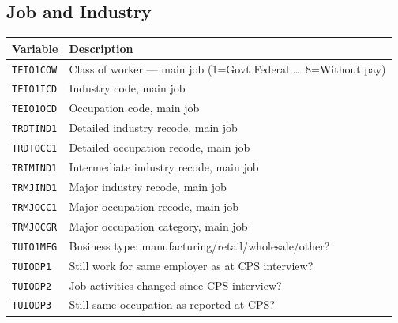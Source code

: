 \documentclass[11pt, a4paper]{article}
\begin{document}
\subsection{Job and Industry}
\begin{longtable}{L{3.5cm} L{12cm}}
\toprule \textbf{Variable} & \textbf{Description} \\ \midrule \endhead
\bottomrule \endfoot
\texttt{TEIO1COW} & Class of worker --- main job (1=Govt Federal \ldots\
                    8=Without pay) \\
 \texttt{TEIO1ICD} & Industry code, main job \\
\texttt{TEIO1OCD} & Occupation code, main job \\
 \texttt{TRDTIND1} & Detailed industry recode, main job \\
\texttt{TRDTOCC1} & Detailed occupation recode, main job \\
 \texttt{TRIMIND1} & Intermediate industry recode, main job \\
\texttt{TRMJIND1} & Major industry recode, main job \\
 \texttt{TRMJOCC1} & Major occupation recode, main job \\
\texttt{TRMJOCGR} & Major occupation category, main job \\
 \texttt{TUIO1MFG} & Business type: manufacturing/retail/wholesale/other? \\
\texttt{TUIODP1}  & Still work for same employer as at CPS interview? \\
\rowcolor{rowgray} \texttt{TUIODP2}  & Job activities changed since CPS interview? \\
\texttt{TUIODP3}  & Still same occupation as reported at CPS? \\
\end{longtable}

\end{document}
